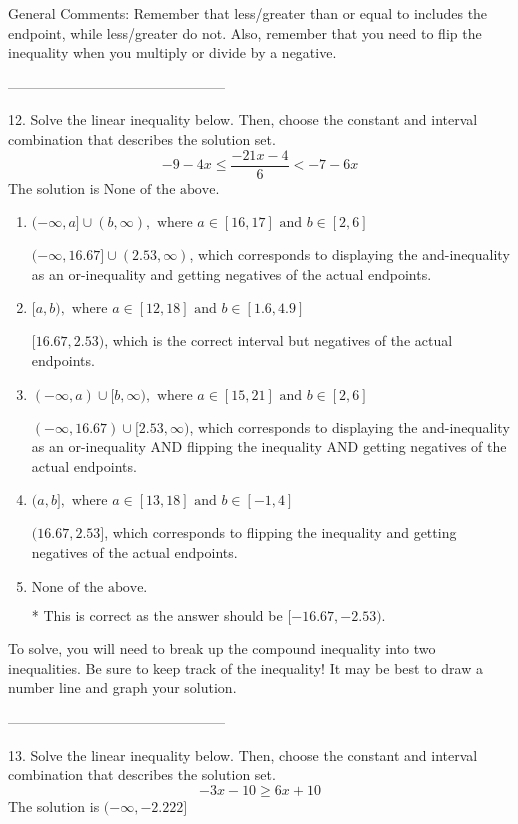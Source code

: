 \documentclass{extbook}[14pt]
\begin{document}
General Comments: Remember that less/greater than or equal to includes the endpoint, while less/greater do not. Also, remember that you need to flip the inequality when you multiply or divide by a negative.

-----------------------------------------------

12. Solve the linear inequality below. Then, choose the constant and interval combination that describes the solution set.
\[ -9 - 4 x \leq \frac{-21 x - 4}{6} < -7 - 6 x \] 
The solution is $ \text{None of the above.} $ 

\begin{enumerate}[label=\Alph*.] 
\item $ (-\infty, a] \cup (b, \infty), \text{ where } a \in [16, 17] \text{ and } b \in [2, 6] $ 

 $(-\infty, 16.67] \cup (2.53, \infty)$, which corresponds to displaying the and-inequality as an or-inequality and getting negatives of the actual endpoints. 
\item $ [a, b), \text{ where } a \in [12, 18] \text{ and } b \in [1.6, 4.9] $ 

 $[16.67, 2.53)$, which is the correct interval but negatives of the actual endpoints. 
\item $ (-\infty, a) \cup [b, \infty), \text{ where } a \in [15, 21] \text{ and } b \in [2, 6] $ 

 $(-\infty, 16.67) \cup [2.53, \infty)$, which corresponds to displaying the and-inequality as an or-inequality AND flipping the inequality AND getting negatives of the actual endpoints. 
\item $ (a, b], \text{ where } a \in [13, 18] \text{ and } b \in [-1, 4] $ 

 $(16.67, 2.53]$, which corresponds to flipping the inequality and getting negatives of the actual endpoints. 
\item $ \text{None of the above.} $ 

 * This is correct as the answer should be $[-16.67, -2.53)$. 
\end{enumerate} 
 
To solve, you will need to break up the compound inequality into two inequalities. Be sure to keep track of the inequality! It may be best to draw a number line and graph your solution.

-----------------------------------------------

13. Solve the linear inequality below. Then, choose the constant and interval combination that describes the solution set.
\[ -3x -10 \geq 6x + 10 \] 
The solution is $ (-\infty, -2.222] $ 
\end{document}
